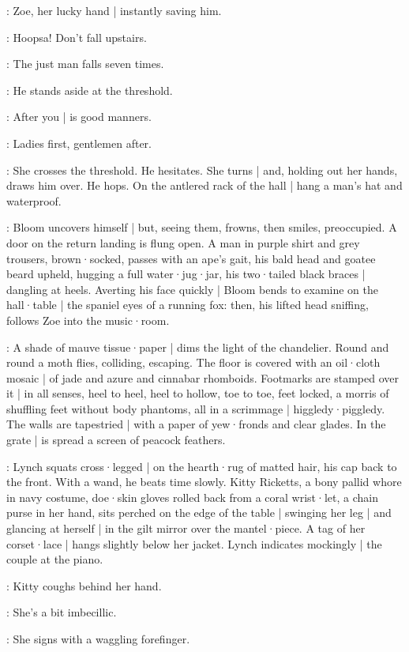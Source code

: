 :
Zoe,
her lucky hand |
instantly saving him.

\Zoe:
Hoopsa!
Don't fall upstairs.

\Bloom:
The just man falls seven times.

:
He stands aside at the threshold.

\Bloom:
After you |
is good manners.

\Zoe:
Ladies first,
gentlemen after.

:
She crosses the threshold.
He hesitates.
She turns |
and,
holding out her hands,
draws him over.
He hops.
On the antlered rack of the hall |
hang a man's hat and waterproof.

:
Bloom uncovers himself |
but,
seeing them,
frowns,
then smiles,
preoccupied.
A door on the return landing is flung open.
A man in purple shirt and grey trousers,
brown·socked,
passes with an ape's gait,
his bald head and goatee beard upheld,
hugging a full water·jug·jar,
his two·tailed black braces |
dangling at heels.
Averting his face quickly |
Bloom bends to examine on the hall·table |
the spaniel eyes of a running fox:
then,
his lifted head sniffing,
follows Zoe into the music·room.

:
A shade of mauve tissue·paper |
dims the light of the chandelier.
Round and round a moth flies,
colliding,
escaping.
The floor is covered with an oil·cloth mosaic |
of jade and azure and cinnabar rhomboids.
Footmarks are stamped over it |
in all senses,
heel to heel,
heel to hollow,
toe to toe,
feet locked,
a morris of shuffling feet without body phantoms,
all in a scrimmage |
higgledy·piggledy.
The walls are tapestried |
with a paper of yew·fronds and clear glades.
In the grate |
is spread a screen of peacock feathers.

:
Lynch squats cross·legged |
on the hearth·rug of matted hair,
his cap back to the front.
With a wand,
he beats time slowly.
Kitty Ricketts,
a bony pallid whore in navy costume,
doe·skin gloves rolled back from a coral wrist·let,
a chain purse in her hand,
sits perched on the edge of the table |
swinging her leg |
and glancing at herself |
in the gilt mirror over the mantel·piece.
A tag of her corset·lace |
hangs slightly below her jacket.
Lynch indicates mockingly |
the couple at the piano.

:
Kitty coughs behind her hand.

\Kitty:
She's a bit imbecillic.

:
She signs with a waggling forefinger.

